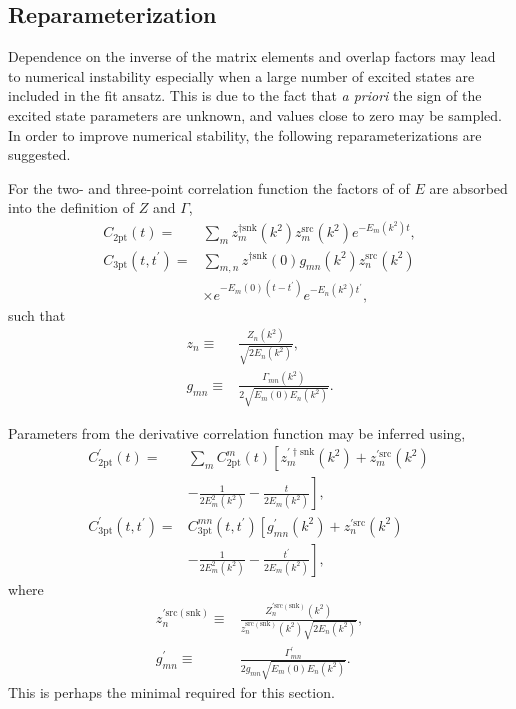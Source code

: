 \documentclass[prd,aps,twocolumn,superscriptaddress,tightenlines,nofootinbib,floatfix,preprintnumbers,10pt]{revtex4-1}
\begin{document}
\subsection{Reparameterization}
Dependence on the inverse of the matrix elements and overlap factors may lead to numerical instability especially when a large number of excited states are included in the fit ansatz. This is due to the fact that {\it{a priori}} the sign of the excited state parameters are unknown, and values close to zero may be sampled. In order to improve numerical stability, the following reparameterizations are suggested.

For the two- and three-point correlation function the factors of of $E$ are absorbed into the definition of $Z$ and $\Gamma$,
\begin{align}
C_{\textrm{2pt}}(t) = & \sum_m z^{\dagger\mathrm{snk}}_m(k^2) z^{\mathrm{src}}_m(k^2) e^{-E_m(k^2)t},\\
C_{\textrm{3pt}}(t,t^\prime) = & \sum_{m,n}z^{\dagger\mathrm{snk}}(0)g_{mn}(k^2)z_n^{\mathrm{src}}(k^2)\nonumber \\
&\times e^{-E_m(0)(t-t^\prime)}e^{-E_n(k^2)t^\prime},
\end{align}
such that
\begin{align}
z_n \equiv & \frac{Z_n(k^2)}{\sqrt{2E_n(k^2)}},\\
g_{mn} \equiv & \frac{\Gamma_{mn}(k^2)}{2\sqrt{E_m(0)E_n(k^2)}}.
\end{align}

Parameters from the derivative correlation function may be inferred using,
\begin{align}
C^\prime_{\mathrm{2pt}}(t) = & \sum_m C^m_{\mathrm{2pt}}(t)\left[z^{\prime\dagger\mathrm{snk}}_m(k^2)+z^{\prime\mathrm{src}}_m(k^2)\frac{}{}\right.\nonumber\\
&\left.-\frac{1}{2E_m^2(k^2)}-\frac{t}{2E_m(k^2)}\right],\\
C^\prime_{\mathrm{3pt}}(t,t^\prime)= & C_{\mathrm{3pt}}^{mn}(t,t^\prime)\left[g^\prime_{mn}(k^2)+z^{\prime\mathrm{src}}_n(k^2)\frac{}{}\right.\nonumber\\
&\left.-\frac{1}{2E_m^2(k^2)}-\frac{t^\prime}{2E_m(k^2)}\right],
\end{align}
where
\begin{align}
z^{\prime\mathrm{src(snk)}}_n\equiv & \frac{Z^{\prime\mathrm{src(snk)}}_n(k^2)}{z_n^{\mathrm{src(snk)}}(k^2)\sqrt{2E_n(k^2)}},\\
g^\prime_{mn} \equiv & \frac{\Gamma^\prime_{mn}}{2g_{mn}\sqrt{E_m(0)E_n(k^2)}}.
\end{align}
{\color{red} This is perhaps the minimal required for this section.}
\end{document}
